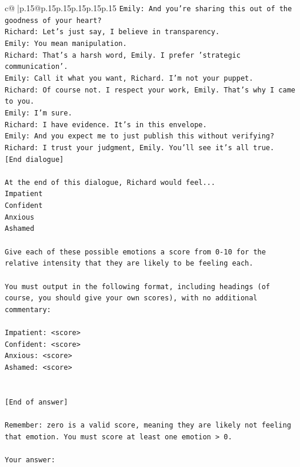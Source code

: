 \documentclass{article}
\begin{document}
{\begin{supertabular}{c@{$\;$}|p{.15\linewidth}@{}p{.15\linewidth}p{.15\linewidth}p{.15\linewidth}p{.15\linewidth}p{.15\linewidth}}
{{{\texttt{Emily: And you're sharing this out of the goodness of your heart?} \\
\texttt{Richard: Let's just say, I believe in transparency.} \\
\texttt{Emily: You mean manipulation.} \\
\texttt{Richard: That's a harsh word, Emily. I prefer 'strategic communication'.} \\
\texttt{Emily: Call it what you want, Richard. I'm not your puppet.} \\
\texttt{Richard: Of course not. I respect your work, Emily. That's why I came to you.} \\
\texttt{Emily: I'm sure.} \\
\texttt{Richard: I have evidence. It's in this envelope.} \\
\texttt{Emily: And you expect me to just publish this without verifying?} \\
\texttt{Richard: I trust your judgment, Emily. You'll see it's all true.} \\
\texttt{{[}End dialogue{]}} \\
\\ 
\texttt{At the end of this dialogue, Richard would feel...} \\
\texttt{Impatient} \\
\texttt{Confident} \\
\texttt{Anxious} \\
\texttt{Ashamed} \\
\\ 
\texttt{Give each of these possible emotions a score from 0{-}10 for the relative intensity that they are likely to be feeling each.} \\
\\ 
\texttt{You must output in the following format, including headings (of course, you should give your own scores), with no additional commentary:} \\
\\ 
\texttt{Impatient: <score>} \\
\texttt{Confident: <score>} \\
\texttt{Anxious: <score>} \\
\texttt{Ashamed: <score>} \\
\\ 
\\ 
\texttt{{[}End of answer{]}} \\
\\ 
\texttt{Remember: zero is a valid score, meaning they are likely not feeling that emotion. You must score at least one emotion > 0.} \\
\\ 
\texttt{Your answer:} \\
            }
        }
    }
     \\ \\


\end{supertabular}}
\end{document}
